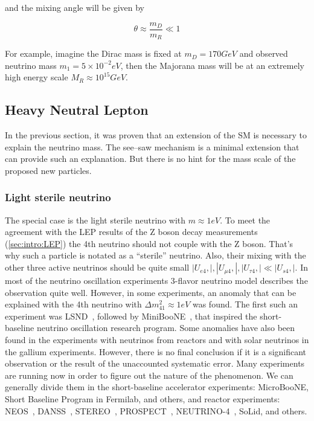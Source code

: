 \documentclass[../main.tex]{subfiles}
\begin{document}
and the mixing angle will be given by

\begin{equation}
\theta\approx\frac{m_D}{m_R} \ll 1
\end{equation}

For example, imagine the Dirac mass is fixed at $m_D=170 GeV$ and observed neutrino mass $m_1=5\times 10^{-2} eV$, then the Majorana mass will be at an extremely high energy scale $M_R\approx10^{15}GeV$.

\subsection{Heavy Neutral Lepton}
\label{sec:intro:HNL}
In the previous section, it was proven that an extension of the SM is necessary to explain the neutrino mass. The see--saw mechanism is a minimal extension that can provide such an explanation. But there is no hint for the mass scale of the proposed new particles.

\subsubsection{Light sterile neutrino}
The special case is the light sterile neutrino with $m\approx1eV$. To meet the agreement with the LEP results of the Z boson decay measurements (\autoref{sec:intro:LEP}) the 4th neutrino should not couple with the Z boson. That's why such a particle is notated as a ``sterile'' neutrino. Also, their mixing with the other three active neutrinos should be quite small $\left|U_{e4},\right|, \left|U_{\mu4},\right|, \left|U_{\tau4},\right| \ll \left|U_{s4},\right|$. In most of the neutrino oscillation experiments 3-flavor neutrino model describes the observation quite well. However, in some experiments, an anomaly that can be explained with the 4th neutrino with $\Delta m_{41}^2\approx1eV$ was found. The first such an experiment was LSND~\cite{Athanassopoulos1997}, followed by MiniBooNE~\cite{Aguilar-Arevalo2010}, that inspired the short-baseline neutrino oscillation research program. Some anomalies have also been found in the experiments with neutrinos from reactors and with solar neutrinos in the gallium experiments. However, there is no final conclusion if it is a significant observation or the result of the unaccounted systematic error. Many experiments are running now in order to figure out the nature of the phenomenon. We can generally divide them in the short-baseline accelerator experiments: MicroBooNE, Short Baseline Program in Fermilab, and others, and reactor experiments: NEOS~\cite{Ko2017}, DANSS~\cite{Alekseev2018}, STEREO~\cite{Almazan2018}, PROSPECT~\cite{Ashenfelter2018}, NEUTRINO-4~\cite{Serebrov2015}, SoLid, and others.
\end{document}

